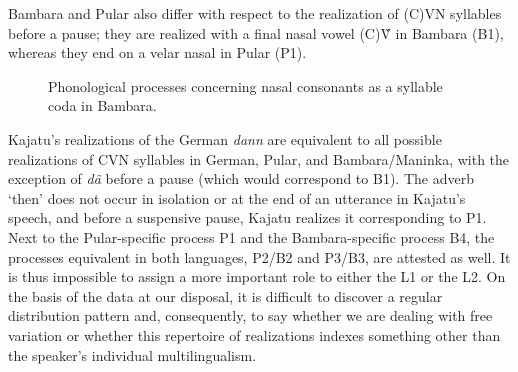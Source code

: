 \documentclass[output=paper]{langscibook}
\begin{document}
Bambara and Pular also differ with respect to the realization of (C)VN syllables before a pause; they are realized with a final nasal vowel (C)Ṽ in Bambara (B1), whereas they end on a velar nasal in Pular (P1).



\begin{figure}
\caption{Phonological processes concerning nasal consonants as a syllable coda in Bambara.}
\label{fanego:fig:3}
\end{figure}



\noindent
Kajatu’s realizations of the German \textit{dann} are equivalent to all possible realizations of CVN syllables in German, Pular, and Bambara/Maninka, with the exception of \textit{dã} before a pause (which would correspond to B1). The adverb ‘then’ does not occur in isolation or at the end of an utterance in Kajatu’s speech, and before a suspensive pause, Kajatu realizes it corresponding to P1. Next to the Pular-specific process P1 and the Bambara-specific process B4, the processes equivalent in both languages, P2/B2 and P3/B3, are attested as well. It is thus impossible to assign a more important role to either the L1 or the L2. On the basis of the data at our disposal, it is difficult to discover a regular distribution pattern and, consequently, to say whether we are dealing with free variation or whether this repertoire of realizations indexes something other than the speaker’s individual multilingualism.
\end{document}
